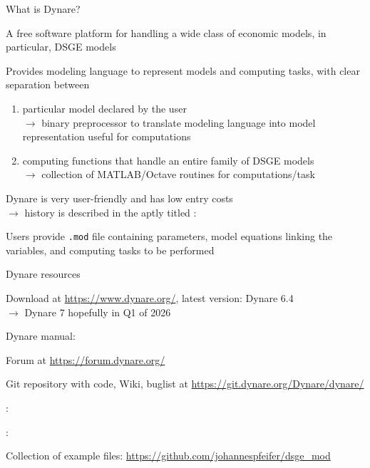 \documentclass[handout,usepdftitle=false,xcolor=dvipsnames,aspectratio=169]{beamer}
\begin{document}
\begin{frame}{What is Dynare?}
	\begin{witemize}
	    \item A free software platform for handling a wide class of economic models, in particular, DSGE models
        \item Provides modeling language to represent models and computing tasks, with clear separation between
        \begin{enumerate}
          \item particular model declared by the user\\
          $\rightarrow$ binary preprocessor to translate modeling language into model representation useful for computations
          \item computing functions that handle an entire family of DSGE models\\
          $\rightarrow$ collection of MATLAB/Octave routines for computations/task
        \end{enumerate}
	    \item Dynare is very user-friendly and has low entry costs\\
        $\rightarrow$ history is described in the aptly titled \textcite{CherrierEtAl2023}: 
	    \item Users provide \texttt{.mod} file containing parameters, model equations linking the variables, and computing tasks to be performed
	\end{witemize}
\end{frame}

\begin{frame}{Dynare resources}
	\begin{witemize}
	    \item Download at \url{https://www.dynare.org/}, latest version: Dynare 6.4\\
        $\rightarrow$ Dynare 7 hopefully in Q1 of 2026
        \item Dynare manual: \textcite{Adjemianetal2024}
        \item Forum at \url{https://forum.dynare.org/}
        \item Git repository with code, Wiki, buglist at \url{https://git.dynare.org/Dynare/dynare/}
        \item \textcite{Pfeifer2013}: \href{https://drive.google.com/file/d/1r89OU5OE3CBa6tOlj6l3hNVWEaRH5Anv/view}{}
        \item \textcite{Pfeifer2013Graphs}: \href{https://drive.google.com/file/d/1DO1OK5AKLWfcJX49ZPCGo58Ni2LdERw4/view}{}
        \item Collection of example files: \url{https://github.com/johannespfeifer/dsge_mod}
	\end{witemize}
\end{frame}
\end{document}
